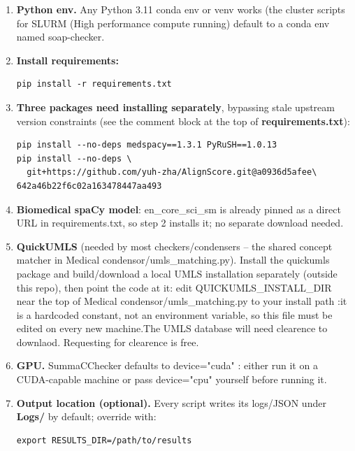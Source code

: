\documentclass[11pt,a4paper]{article}
\begin{document}
\begin{enumerate}
  \item \textbf{Python env.} Any Python 3.11 conda env or venv works (the
  cluster scripts for SLURM (High performance compute running) default to a conda env named soap-checker.
  \item \textbf{Install requirements:}
\begin{verbatim}
pip install -r requirements.txt
\end{verbatim}

  \item \textbf{Three packages need installing separately}, bypassing stale
  upstream version constraints (see the comment block at the top of
  \textbf{requirements.txt}):
\begin{verbatim}
pip install --no-deps medspacy==1.3.1 PyRuSH==1.0.13
pip install --no-deps \
  git+https://github.com/yuh-zha/AlignScore.git@a0936d5afee\
642a46b22f6c02a163478447aa493
\end{verbatim}

  \item \textbf{Biomedical spaCy model}: en\_core\_sci\_sm is already
  pinned as a direct URL in requirements.txt, so step 2 installs it;
  no separate download needed.

  \item \textbf{QuickUMLS} (needed by most checkers/condensers -- the shared
  concept matcher in Medical condensor/umls\_matching.py). Install the
  quickumls package and build/download a local UMLS installation
  separately (outside this repo), then point the code at it: edit
  QUICKUMLS\_INSTALL\_DIR near the top of
  Medical condensor/umls\_matching.py to your install path :it is a
  hardcoded constant, not an environment variable, so this file must be
  edited on every new machine.The UMLS database will need clearence to downlaod. Requesting for clearence is free.

  \item \textbf{GPU.} SummaCChecker defaults to device="cuda" :
  either run it on a CUDA-capable machine or pass device="cpu"
  yourself before running it.

  \item \textbf{Output location (optional).} Every script writes its
  logs/JSON under \textbf{Logs/} by default; override with:
\begin{verbatim}
export RESULTS_DIR=/path/to/results
\end{verbatim}
\end{enumerate}
\end{document}
